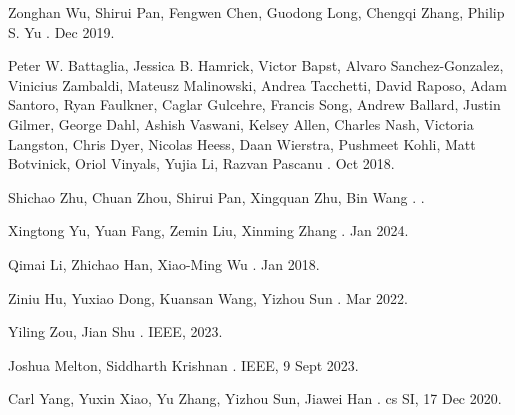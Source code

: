\documentclass{report} %
\begin{document}
\begin{thebibliography}{00}
    \newblock Zonghan Wu, Shirui Pan, Fengwen Chen, Guodong Long, Chengqi Zhang, Philip S. Yu
    .
     Dec 2019.

    \newblock Peter W. Battaglia, Jessica B. Hamrick, Victor Bapst, Alvaro Sanchez-Gonzalez, Vinicius Zambaldi, Mateusz Malinowski, Andrea Tacchetti, David Raposo, 
    Adam Santoro, Ryan Faulkner, Caglar Gulcehre, Francis Song, Andrew Ballard, Justin Gilmer, George Dahl, Ashish Vaswani, Kelsey Allen, Charles Nash,
    Victoria Langston, Chris Dyer, Nicolas Heess, Daan Wierstra, Pushmeet Kohli, Matt Botvinick, Oriol Vinyals, Yujia Li, Razvan Pascanu
    .
     Oct 2018.

    \newblock Shichao Zhu, Chuan Zhou, Shirui Pan, Xingquan Zhu, Bin Wang
    .
    .

    \newblock Xingtong Yu, Yuan Fang, Zemin Liu, Xinming Zhang
    .
     Jan 2024.

    \newblock Qimai Li, Zhichao Han, Xiao-Ming Wu
    .
     Jan 2018.

    \newblock Ziniu Hu, Yuxiao Dong, Kuansan Wang, Yizhou Sun
    .
     Mar 2022.

    \newblock Yiling Zou, Jian Shu
    .
    \newblock IEEE, 2023.

    \newblock Joshua Melton, Siddharth Krishnan
    .
    \newblock IEEE, 9 Sept 2023.

    \newblock Carl Yang, Yuxin Xiao, Yu Zhang, Yizhou Sun, Jiawei Han
    .
    \newblock cs SI, 17 Dec 2020.


\end{thebibliography}
\end{document}

